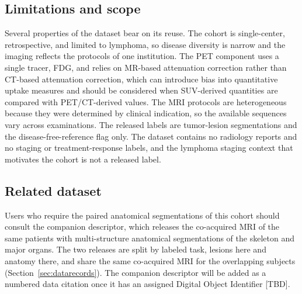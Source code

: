 \subsection*{Limitations and scope}\label{subsec:limits}
Several properties of the dataset bear on its reuse.
The cohort is single-center, retrospective, and limited to lymphoma, so disease diversity is narrow and the imaging reflects the protocols of one institution.
The PET component uses a single tracer, FDG, and relies on MR-based attenuation correction rather than CT-based attenuation correction, which can introduce bias into quantitative uptake measures and should be considered when SUV-derived quantities are compared with PET/CT-derived values.
The MRI protocols are heterogeneous because they were determined by clinical indication, so the available sequences vary across examinations.
The released labels are tumor-lesion segmentations and the disease-free-reference flag only.
The dataset contains no radiology reports and no staging or treatment-response labels, and the lymphoma staging context that motivates the cohort is not a released label.

\subsection*{Related dataset}\label{subsec:relatedusage}
Users who require the paired anatomical segmentations of this cohort should consult the companion descriptor, which releases the co-acquired MRI of the same patients with multi-structure anatomical segmentations of the skeleton and major organs.
The two releases are split by labeled task, lesions here and anatomy there, and share the same co-acquired MRI for the overlapping subjects (Section~\ref{sec:datarecords}).
The companion descriptor will be added as a numbered data citation once it has an assigned Digital Object Identifier [TBD].

